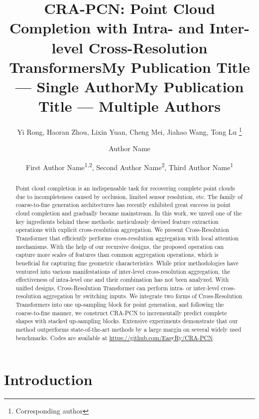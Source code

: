 \documentclass[letterpaper]{article} %
\title{CRA-PCN: Point Cloud Completion with Intra- and Inter-level Cross-Resolution Transformers}
\author{
    Yi Rong,
    Haoran Zhou,
    Lixin Yuan,
    Cheng Mei,
    Jiahao Wang,
    Tong Lu \thanks{Corresponding author}
}
\title{My Publication Title --- Single Author}
\author {
    Author Name
}
\title{My Publication Title --- Multiple Authors}
\author {
    First Author Name\textsuperscript{\rm 1,\rm 2},
    Second Author Name\textsuperscript{\rm 2},
    Third Author Name\textsuperscript{\rm 1}
}
\begin{document}
\maketitle

\begin{abstract}
Point cloud completion is an indispensable task for recovering complete point clouds due to incompleteness caused by occlusion, limited sensor resolution, etc. 
The family of coarse-to-fine generation architectures has recently exhibited great success in point cloud completion and gradually became mainstream.  
In this work, we unveil one of the key ingredients behind these methods: meticulously devised feature extraction operations with explicit cross-resolution aggregation.
We present Cross-Resolution Transformer that efficiently performs cross-resolution aggregation with local attention mechanisms. 
With the help of our recursive designs, the proposed operation  can capture more scales of features than common aggregation operations, which is beneficial for capturing fine geometric characteristics.  
While prior methodologies have ventured into various manifestations of inter-level cross-resolution aggregation, the effectiveness of intra-level one and their combination has not been analyzed. 
With unified designs, Cross-Resolution Transformer can perform intra- or inter-level cross-resolution aggregation by switching inputs. 
We integrate two forms of Cross-Resolution Transformers into one up-sampling block for point generation, and following the coarse-to-fine manner, we construct CRA-PCN to incrementally predict complete shapes with stacked up-sampling blocks. 
Extensive experiments  demonstrate that our method outperforms state-of-the-art methods by a large margin on several widely used benchmarks. 
Codes are available at \url{https://github.com/EasyRy/CRA-PCN}.
\end{abstract}

\section{Introduction}
\end{document}
